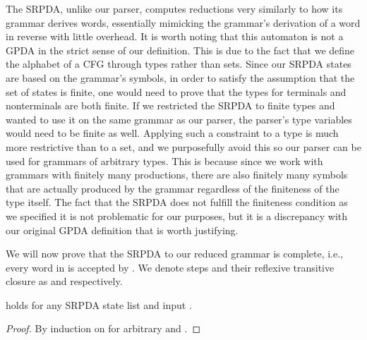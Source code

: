 \begin{isabellebody}
\begin{isamarkuptext}
The SRPDA, unlike our  parser, computes reductions very similarly to how its grammar
derives words, essentially mimicking the grammar's derivation of a word in reverse with little overhead.
It is worth noting that this automaton is not a GPDA in the strict sense of our definition. This is due to the 
fact that we define the alphabet of a CFG through types rather than sets. Since our SRPDA states 
are based on the grammar's symbols, in order to satisfy the assumption that the set of states is finite, one 
would need to prove that the types for terminals and nonterminals are both finite. If we restricted
the SRPDA to finite types and wanted to use it on the same grammar as our parser, the parser's type 
variables would need to be finite as well. Applying such a constraint to a type is much more restrictive 
than to a set, and we purposefully avoid this so our parser can be used for grammars of arbitrary 
types. This is because since we work with grammars with finitely many productions, there are also
finitely many symbols that are actually produced by the grammar regardless of the finiteness of the
type itself. The fact that the SRPDA does not fulfill the finiteness condition as we specified it is
not problematic for our purposes, but it is a discrepancy with our original GPDA definition that is
worth justifying.

We will now prove that the SRPDA to our reduced grammar  is complete, i.e., every word in 
 is accepted by . We denote  steps and their reflexive transitive
closure as  and  respectively.

\begin{lemma}\label{prefix_consumable}
 holds for any SRPDA state list 
 and input .
\begin{proof}
By induction on  for arbitrary  and \isa{{\isasymalpha}}.
\end{proof}
\end{lemma}


\end{isamarkuptext}
\end{isabellebody}
